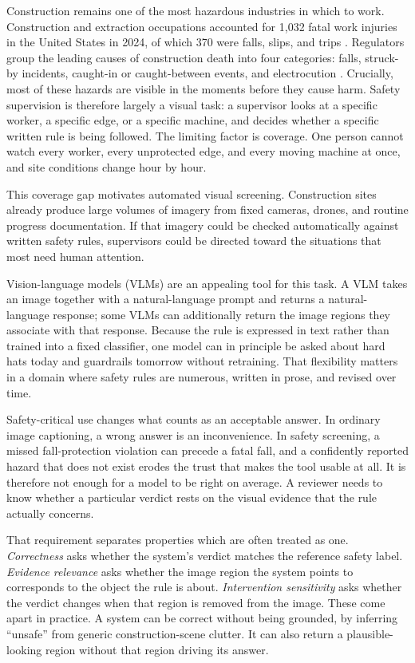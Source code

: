 \documentclass[conference]{IEEEtran}
\begin{document}
Construction remains one of the most hazardous industries in which to work. Construction and extraction occupations accounted for 1,032 fatal work injuries in the United States in 2024, of which 370 were falls, slips, and trips \cite{bls2024}. Regulators group the leading causes of construction death into four categories: falls, struck-by incidents, caught-in or caught-between events, and electrocution \cite{osha}. Crucially, most of these hazards are visible in the moments before they cause harm. Safety supervision is therefore largely a visual task: a supervisor looks at a specific worker, a specific edge, or a specific machine, and decides whether a specific written rule is being followed. The limiting factor is coverage. One person cannot watch every worker, every unprotected edge, and every moving machine at once, and site conditions change hour by hour.

This coverage gap motivates automated visual screening. Construction sites already produce large volumes of imagery from fixed cameras, drones, and routine progress documentation. If that imagery could be checked automatically against written safety rules, supervisors could be directed toward the situations that most need human attention.

Vision-language models (VLMs) are an appealing tool for this task. A VLM takes an image together with a natural-language prompt and returns a natural-language response; some VLMs can additionally return the image regions they associate with that response. Because the rule is expressed in text rather than trained into a fixed classifier, one model can in principle be asked about hard hats today and guardrails tomorrow without retraining. That flexibility matters in a domain where safety rules are numerous, written in prose, and revised over time.

Safety-critical use changes what counts as an acceptable answer. In ordinary image captioning, a wrong answer is an inconvenience. In safety screening, a missed fall-protection violation can precede a fatal fall, and a confidently reported hazard that does not exist erodes the trust that makes the tool usable at all. It is therefore not enough for a model to be right on average. A reviewer needs to know whether a particular verdict rests on the visual evidence that the rule actually concerns.

That requirement separates properties which are often treated as one. \textit{Correctness} asks whether the system's verdict matches the reference safety label. \textit{Evidence relevance} asks whether the image region the system points to corresponds to the object the rule is about. \textit{Intervention sensitivity} asks whether the verdict changes when that region is removed from the image. These come apart in practice. A system can be correct without being grounded, by inferring ``unsafe'' from generic construction-scene clutter. It can also return a plausible-looking region without that region driving its answer.
\end{document}
